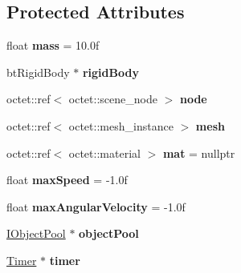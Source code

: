 \subsection*{Protected Attributes}
\begin{DoxyCompactItemize}
\item 
\hypertarget{class_arena_1_1_physics_object_a2f649336338c0ce7b1bfcbb908cdc33f}{float {\bfseries mass} = 10.\+0f}\label{class_arena_1_1_physics_object_a2f649336338c0ce7b1bfcbb908cdc33f}

\item 
\hypertarget{class_arena_1_1_physics_object_a90793038cf2e5c6651fce3ff5ed3adea}{bt\+Rigid\+Body $\ast$ {\bfseries rigid\+Body}}\label{class_arena_1_1_physics_object_a90793038cf2e5c6651fce3ff5ed3adea}

\item 
\hypertarget{class_arena_1_1_physics_object_a89fe9ca970918ea506cdf8de3ce5cfa2}{octet\+::ref$<$ octet\+::scene\+\_\+node $>$ {\bfseries node}}\label{class_arena_1_1_physics_object_a89fe9ca970918ea506cdf8de3ce5cfa2}

\item 
\hypertarget{class_arena_1_1_physics_object_adc2444538f8539d1bc16918ab9ce2a61}{octet\+::ref$<$ octet\+::mesh\+\_\+instance $>$ {\bfseries mesh}}\label{class_arena_1_1_physics_object_adc2444538f8539d1bc16918ab9ce2a61}

\item 
\hypertarget{class_arena_1_1_physics_object_a827ffc8e751beeaf55171a0749c215fd}{octet\+::ref$<$ octet\+::material $>$ {\bfseries mat} = nullptr}\label{class_arena_1_1_physics_object_a827ffc8e751beeaf55171a0749c215fd}

\item 
\hypertarget{class_arena_1_1_physics_object_a8ea2f5931d56f2c3800a27f730171807}{float {\bfseries max\+Speed} = -\/1.\+0f}\label{class_arena_1_1_physics_object_a8ea2f5931d56f2c3800a27f730171807}

\item 
\hypertarget{class_arena_1_1_physics_object_a52b2d9cd6c5951177c8f1b8b7b9d46ff}{float {\bfseries max\+Angular\+Velocity} = -\/1.\+0f}\label{class_arena_1_1_physics_object_a52b2d9cd6c5951177c8f1b8b7b9d46ff}

\item 
\hypertarget{class_arena_1_1_physics_object_a112cd69b990dc7e5fdba1be81a5db0ac}{\hyperlink{class_arena_1_1_i_object_pool}{I\+Object\+Pool} $\ast$ {\bfseries object\+Pool}}\label{class_arena_1_1_physics_object_a112cd69b990dc7e5fdba1be81a5db0ac}

\item 
\hypertarget{class_arena_1_1_physics_object_a465e469eb51b464e478f4504dfbf685b}{\hyperlink{class_timer}{Timer} $\ast$ {\bfseries timer}}\label{class_arena_1_1_physics_object_a465e469eb51b464e478f4504dfbf685b}

\end{DoxyCompactItemize}
